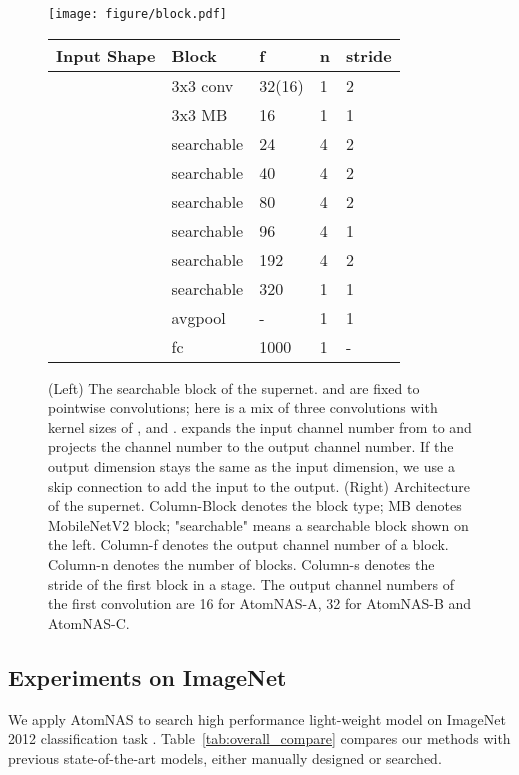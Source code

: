 \documentclass{article} \usepackage{iclr2020_conference,times}
\begin{document}
\begin{figure}[t]
\centering
\texttt{[image: figure/block.pdf]}
\qquad
\begin{tabular}[b]{lllll}
\toprule
Input Shape & Block & f & n & stride \\
\midrule
 & 3x3 conv & 32(16) & 1 & 2 \\
 & 3x3 MB & 16 & 1 & 1 \\
 & searchable & 24 & 4 & 2 \\
 & searchable & 40 & 4 & 2 \\
 & searchable & 80 & 4 & 2 \\
 & searchable & 96 & 4 & 1 \\
 & searchable & 192 & 4 & 2 \\
 & searchable & 320 & 1 & 1 \\
 & avgpool & - & 1 & 1 \\
 & fc & 1000 & 1 & - \\
\bottomrule
\end{tabular}
\caption{(Left) The searchable block of the supernet.  and  are fixed to  pointwise convolutions;  here is a mix of three convolutions with kernel sizes of ,  and .  expands the input channel number from  to  and  projects the channel number to the output channel number. If the output dimension
stays the same as the input dimension, we use a skip connection to add the input to the output. (Right) Architecture of the supernet. Column-Block denotes the block type; MB denotes MobileNetV2 block; "searchable" means a searchable block shown on the left.  Column-f denotes the output channel number of a block. Column-n denotes the number of blocks. Column-s denotes the stride of the first block in a stage. The output channel numbers of the first convolution are 16 for AtomNAS-A, 32 for AtomNAS-B and AtomNAS-C.}
\label{fig:tbs}
\end{figure}





\subsection{Experiments on ImageNet}
\label{sub:imagenet_expr}

We apply AtomNAS to search high performance light-weight model on ImageNet 2012 classification task \citep{deng2009imagenet}. Table~\ref{tab:overall_compare} compares our methods with previous state-of-the-art models, either manually designed or searched. 
\end{document}
